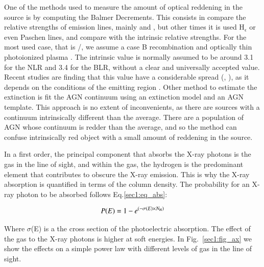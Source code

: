 One of the methods used to measure the amount of optical reddening in the source is by computing the Balmer Decrements. This consists in compare the relative strengths of emission lines, mainly \Ha and \Hb, but other times it is used H$_{\epsilon}$ or even Paschen lines, and compare with the intrinsic relative strengths. For the most used case, that is \Ha/\Hb, we assume a case B recombination and optically thin photoionized plasma \citep{osterbrock89}. The intrinsic value is normally assumed to be around 3.1 for the NLR and 3.4 for the BLR, without a clear and universally accepted value. Recent studies are finding that this value have a considerable spread (\citealt{jin12}, \citealt{schnorr16}), as it depends on the conditions of the emitting region \citep{netzer13}. Other method to estimate the extinction is fit the AGN continuum using an extinction model and an AGN template. This approach is no extent of inconvenients, as there are sources with a continuum intrinsically different than the average. There are a population of AGN whose continuum is redder than the average, and so the method can confuse intrinsically red object with a small amount of reddening in the source.



In a first order, the principal component that absorbs the X-ray photons is the gas in the line of sight, and within the gas, the hydrogen is the predominant element that contributes to obscure the X-ray emission. This is why the X-ray absorption is quantified in terms of the \NH column density. The probability for an X-ray photon to be absorbed follows Eq.\ref{sec1:eq_abs}: 

\begin{equation}\label{sec1:eq_abs}
P(E)=1-e^{(-\sigma(E) \times N_{\rm H})}
\end{equation}

Where $\sigma$(E) is a the cross section of the photoelectric absorption. The effect of the gas to the X-ray photons is higher at soft energies. In Fig.~\ref{sec1:fig_ax} we show the effects on a simple power law with different levels of gas in the line of sight.


